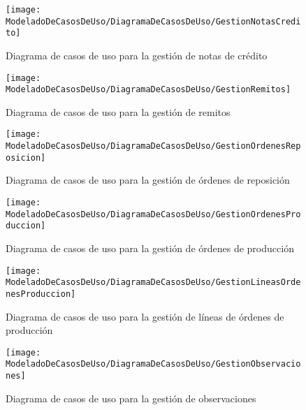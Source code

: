     \begin{figure}[H]
		\centering
		\texttt{[image: ModeladoDeCasosDeUso/DiagramaDeCasosDeUso/GestionNotasCredito]}
		\caption{Diagrama de casos de uso para la gestión de notas de crédito}
	\label{fig:GestionNotasCredito}
    \end{figure}
    \begin{figure}[H]
		\centering
		\texttt{[image: ModeladoDeCasosDeUso/DiagramaDeCasosDeUso/GestionRemitos]}
		\caption{Diagrama de casos de uso para la gestión de remitos}
	\label{fig:GestionRemitos}
    \end{figure}
    \begin{figure}[H]
		\centering
		\texttt{[image: ModeladoDeCasosDeUso/DiagramaDeCasosDeUso/GestionOrdenesReposicion]}
		\caption{Diagrama de casos de uso para la gestión de órdenes de reposición}
	\label{fig:GestionOrdenesReposicion}
    \end{figure}
    \begin{figure}[H]
		\centering
		\texttt{[image: ModeladoDeCasosDeUso/DiagramaDeCasosDeUso/GestionOrdenesProduccion]}
		\caption{Diagrama de casos de uso para la gestión de órdenes de producción}
	\label{fig:GestionOrdenesProduccion}
    \end{figure}
    \begin{figure}[H]
		\centering
		\texttt{[image: ModeladoDeCasosDeUso/DiagramaDeCasosDeUso/GestionLineasOrdenesProduccion]}
		\caption{Diagrama de casos de uso para la gestión de líneas de órdenes de producción}
	\label{fig:GestionLineasOrdenesProduccion}
    \end{figure}
    \begin{figure}[H]
		\centering
		\texttt{[image: ModeladoDeCasosDeUso/DiagramaDeCasosDeUso/GestionObservaciones]}
		\caption{Diagrama de casos de uso para la gestión de observaciones}
	\label{fig:GestionObservaciones}
	\end{figure}
	\clearpage %
